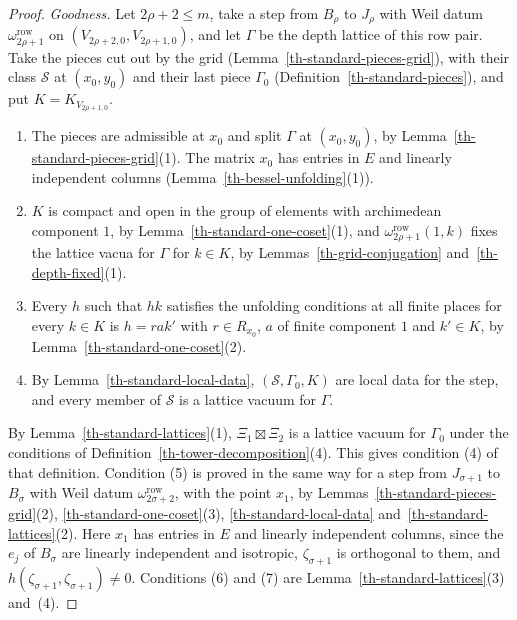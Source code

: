 \begin{proof}
\emph{Goodness.} Let $2\rho+2\leq m$, take a step from $B_\rho$ to $J_\rho$ with
Weil datum $\omega^{\mathrm{row}}_{2\rho+1}$ on $(V_{2\rho+2,0},V_{2\rho+1,0})$,
and let $\Gamma$ be the depth lattice of this row pair. Take the pieces cut out
by the grid (Lemma~\ref{th-standard-pieces-grid}), with their class
$\mathcal S$ at $(x_0,y_0)$ and their last piece $\Gamma_0$
(Definition~\ref{th-standard-pieces}), and put $K=K_{V_{2\rho+1,0}}$.
\begin{enumerate}
\item[(G1)] The pieces are admissible at $x_0$ and split $\Gamma$ at $(x_0,y_0)$,
  by Lemma~\ref{th-standard-pieces-grid}(1). The matrix $x_0$ has entries in $E$
  and linearly independent columns (Lemma~\ref{th-bessel-unfolding}(1)).
\item[(G2)] $K$ is compact and open in the group of elements with archimedean
  component $1$, by Lemma~\ref{th-standard-one-coset}(1), and
  $\omega^{\mathrm{row}}_{2\rho+1}(1,k)$ fixes the lattice vacua for $\Gamma$ for
  $k\in K$, by Lemmas~\ref{th-grid-conjugation} and~\ref{th-depth-fixed}(1).
\item[(G3)] Every $h$ such that $hk$ satisfies the unfolding conditions at all
  finite places for every $k\in K$ is $h=rak'$ with $r\in R_{x_0}$, $a$ of finite
  component $1$ and $k'\in K$, by Lemma~\ref{th-standard-one-coset}(2).
\item[(G4)] By Lemma~\ref{th-standard-local-data}, $(\mathcal S,\Gamma_0,K)$ are
  local data for the step, and every member of $\mathcal S$ is a lattice vacuum
  for $\Gamma$.
\end{enumerate}
By Lemma~\ref{th-standard-lattices}(1), $\Xi_1\boxtimes\Xi_2$ is a lattice vacuum
for $\Gamma_0$ under the conditions of
Definition~\ref{th-tower-decomposition}(4). This gives condition (4) of that
definition. Condition (5) is proved in the same way for a step from
$J_{\sigma+1}$ to $B_\sigma$ with Weil datum $\omega^{\mathrm{row}}_{2\sigma+2}$,
with the point $x_1$, by Lemmas~\ref{th-standard-pieces-grid}(2),
\ref{th-standard-one-coset}(3), \ref{th-standard-local-data}
and~\ref{th-standard-lattices}(2). Here $x_1$ has entries in $E$ and linearly
independent columns, since the $e_j$ of $B_\sigma$ are linearly independent and
isotropic, $\zeta_{\sigma+1}$ is orthogonal to them, and
$h(\zeta_{\sigma+1},\zeta_{\sigma+1})\neq0$. Conditions (6) and (7) are
Lemma~\ref{th-standard-lattices}(3) and~(4).
\end{proof}

